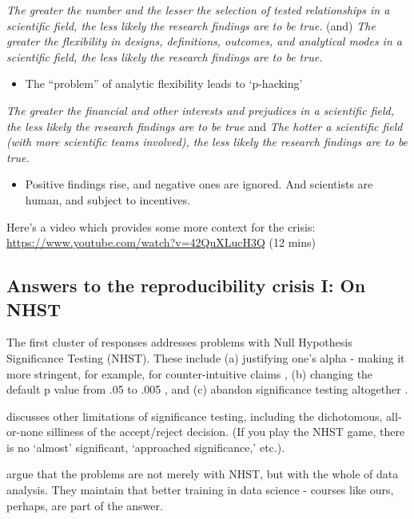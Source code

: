 \documentclass[]{book}
\providecommand{\tightlist}{%
  \setlength{\itemsep}{0pt}\setlength{\parskip}{0pt}}
\theoremstyle{definition}
\theoremstyle{definition}
\theoremstyle{definition}
\theoremstyle{remark}
\begin{document}
\emph{The greater the number and the lesser the selection of tested
relationships in a scientific field, the less likely the research
findings are to be true.} (and) \emph{The greater the flexibility in
designs, definitions, outcomes, and analytical modes in a scientific
field, the less likely the research findings are to be true.}

\begin{itemize}
\tightlist
\item
  The ``problem'' of analytic flexibility leads to `p-hacking'
\end{itemize}

\emph{The greater the financial and other interests and prejudices in a
scientific field, the less likely the research findings are to be true}
and \emph{The hotter a scientific field (with more scientific teams
involved), the less likely the research findings are to be true.}

\begin{itemize}
\tightlist
\item
  Positive findings rise, and negative ones are ignored. And scientists
  are human, and subject to incentives.
\end{itemize}

Here's a video which provides some more context for the crisis:
\url{https://www.youtube.com/watch?v=42QuXLucH3Q} (12 mins)

\subsection{Answers to the reproducibility crisis I: On
NHST}\label{answers-to-the-reproducibility-crisis-i-on-nhst}

The first cluster of responses addresses problems with Null Hypothesis
Significance Testing (NHST). These include (a) justifying one's alpha -
making it more stringent, for example, for counter-intuitive claims
\citep{grange2018justify}, (b) changing the default p value from .05 to
.005 \citep{benjamin2017redefine}, and (c) abandon significance testing
altogether \citep{mcshane2017abandon}.

\citet{szucs2017null} discusses other limitations of significance
testing, including the dichotomous, all-or-none silliness of the
accept/reject decision. (If you play the NHST game, there is no `almost'
significant, `approached significance,' etc.).

\citet{leek2015statistics} argue that the problems are not merely with
NHST, but with the whole of data analysis. They maintain that better
training in data science - courses like ours, perhaps, are part of the
answer.
\end{document}
